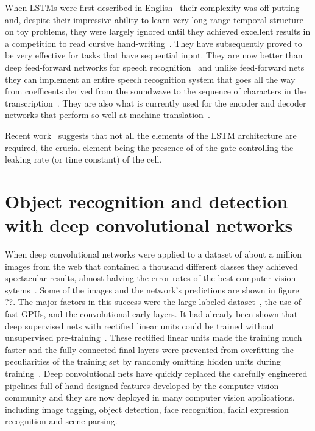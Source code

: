 \documentclass[]{article}
\begin{document}
When LSTMs were first described in
English~\cite{Hochreiter+Schmidhuber-1997} their complexity was off-putting
and, despite their impressive ability to learn very long-range temporal
structure on toy problems, they were largely ignored until they achieved
excellent results in a competition to read cursive
hand-writing~\cite{Graves}. They have subsequently proved to be very
effective for tasks that have sequential input.  They are now better than
deep feed-forward networks for speech recognition~\cite{gravestimit} and
unlike feed-forward nets they can implement an entire speech recognition
system that goes all the way from coefficents derived from the soundwave to
the sequence of characters in the transcription~\cite{gravestimit}.  They
are also what is currently used for the encoder and decoder networks that
perform so well at machine
translation~\citep{Bahdanau-et-al-arxiv2014,Sutskever-et-al-NIPS2014}.

Recent work~\citep{Chung-et-al-NIPSDL2014} suggests that not all the elements of the LSTM
architecture are required, the crucial element being the presence of
of the gate controlling the leaking rate (or time constant) of the cell.


\section{Object recognition and detection with deep convolutional networks}

When deep convolutional networks were applied to a dataset of about a
million images from the web that contained a thousand different classes
they achieved spectacular results, almost halving the error rates of the
best computer vision sytems~\cite{kriz}.  Some of the images and the
network's predictions are shown in figure ??.  The major factors in this
success were the large labeled dataset~\cite{FeiFe}, the use of fast GPUs,
and the convolutional early layers.  It had already been shown that deep
supervised nets with rectified linear units could be trained without
unsupervised pre-training~\citep{Glorot+al-AI-2011-small}. 
These rectified linear units made the
training much faster and the fully connected final layers were prevented
from overfitting the peculiarities of the training set by randomly omitting
hidden units during training~\cite{dropoutJMLR}. Deep convolutional nets
have quickly replaced the carefully engineered pipelines full of
hand-designed features developed by the computer vision community and they
are now deployed in many computer vision applications, including image
tagging, object detection, face recognition, facial expression recognition
and scene parsing.
\end{document}
